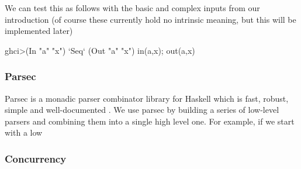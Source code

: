 

We can test this as follows with the basic and complex inputs from our introduction (of course these currently hold no intrinsic meaning, but this will be implemented later)

\begin{code}
    ghci>(In "a" "x") `Seq` (Out "a" "x")
    in(a,x);
    out(a,x)

    

\end{code}

\subsubsection{Parsec}

Parsec is a monadic parser combinator library for Haskell which is fast, robust, simple and well-documented \cite{lm01}. We use parsec by building a series of low-level parsers and combining them into a single high level one.
For example, if we start with a low


\subsubsection{Concurrency}
